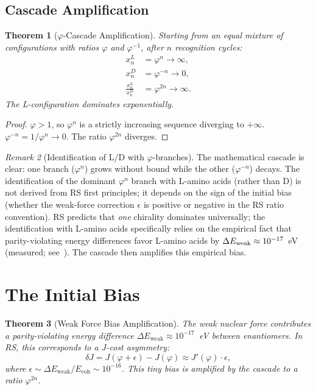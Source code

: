 \documentclass[12pt,a4paper]{article}
\newtheorem{theorem}{Theorem}[section]
\theoremstyle{definition}
\theoremstyle{remark}
\newtheorem{remark}[theorem]{Remark}
\begin{document}
\subsection{Cascade Amplification}

\begin{theorem}[$\varphi$-Cascade Amplification]
\label{thm:cascade}
Starting from an equal mixture of configurations with ratios $\varphi$
and $\varphi^{-1}$, after $n$ recognition cycles:
\begin{align}
  x_n^L &= \varphi^n \to \infty, \\
  x_n^D &= \varphi^{-n} \to 0, \\
  \frac{x_n^L}{x_n^D} &= \varphi^{2n} \to \infty.
\end{align}
The L-configuration dominates exponentially.
\end{theorem}

\begin{proof}
$\varphi > 1$, so $\varphi^n$ is a strictly increasing sequence
diverging to $+\infty$.  $\varphi^{-n} = 1/\varphi^n \to 0$.
The ratio $\varphi^{2n}$ diverges.
\end{proof}

\begin{remark}[Identification of L/D with $\varphi$-branches]
The mathematical cascade is clear: one branch ($\varphi^n$) grows
without bound while the other ($\varphi^{-n}$) decays.  The
identification of the dominant $\varphi^n$ branch with L-amino acids
(rather than D) is not derived from RS first principles; it depends on
the sign of the initial bias (whether the weak-force correction $\epsilon$
is positive or negative in the RS ratio convention).  RS predicts that
\emph{one} chirality dominates universally; the identification with
L-amino acids specifically relies on the empirical fact that
parity-violating energy differences favor L-amino acids by
$\Delta E_{\rm weak} \approx 10^{-17}$~eV (measured;
see~\cite{Hegstrom1980}).  The cascade then amplifies this empirical
bias.
\end{remark}

\section{The Initial Bias}
\label{sec:bias}

\begin{theorem}[Weak Force Bias Amplification]
\label{thm:bias}
The weak nuclear force contributes a parity-violating energy
difference $\Delta E_{\mathrm{weak}} \approx 10^{-17}$~eV between
enantiomers.  In RS, this corresponds to a $J$-cost asymmetry:
\begin{equation}
  \delta J = J(\varphi + \epsilon) - J(\varphi)
  \approx J'(\varphi) \cdot \epsilon,
\end{equation}
where $\epsilon \sim \Delta E_{\mathrm{weak}} / E_{\mathrm{coh}}
\sim 10^{-16}$.  This tiny bias is amplified by the cascade
to a ratio $\varphi^{2n}$.
\end{theorem}
\end{document}
